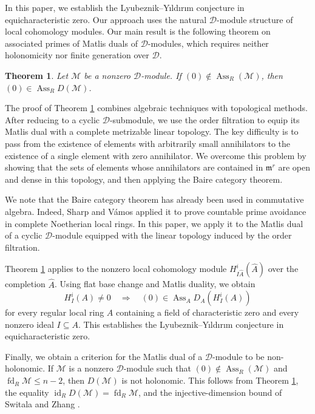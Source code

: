 \documentclass[11pt]{amsart}
\newtheorem{theorem}{Theorem}[section]
\theoremstyle{definition}
\newcommand{\m}{\mathfrak m}
\newcommand{\D}{\mathcal D}
\newcommand{\M}{\mathcal M}
\DeclareMathOperator{\Ass}{Ass}
\begin{document}
In this paper, we establish the Lyubeznik--Y{\i}ld{\i}r{\i}m conjecture in equicharacteristic zero. Our approach uses the natural $\D$-module structure of local cohomology modules. Our main result is the following theorem on associated primes of Matlis duals of $\D$-modules, which requires neither holonomicity nor finite generation over $\D$.
\begin{theorem}\label{t1}
Let $\M$ be a nonzero $\D$-module. If $(0)\notin\Ass _R(\M)$, then $(0)\in\Ass _R D(\M)$. 
\end{theorem}
The proof of Theorem \ref{t1} combines algebraic techniques with topological methods. After reducing to a cyclic $\D$-submodule, we use the order filtration to equip its Matlis dual with a complete metrizable linear topology. The key difficulty is to pass from the existence of elements with arbitrarily small annihilators to the existence of a single element with zero annihilator.  We overcome this problem by showing that the sets of elements whose annihilators are contained in $\m^r$ are open and dense in this topology, and then applying the Baire category theorem.

We note that the Baire category theorem has already been used in commutative algebra. Indeed, Sharp and V\'amos \cite{SV} applied it to prove countable prime avoidance in complete Noetherian local rings. In this paper, we apply it to the Matlis dual of a cyclic $\D$-module equipped with the linear topology induced by the order filtration.

Theorem \ref{t1} applies to the nonzero local cohomology module $H_{I\widehat A}^i(\widehat A)$ over the completion $\widehat A$. Using flat base change and Matlis duality, we obtain
\[
H_I^i(A)\neq 0
\quad\Longrightarrow\quad
(0)\in\Ass_A D_A(H_I^i(A))
\]
for every regular local ring $A$ containing a field of characteristic zero and every nonzero ideal $I\subseteq A$. This establishes the Lyubeznik--Y{\i}ld{\i}r{\i}m conjecture in equicharacteristic zero.

Finally, we obtain a criterion for the Matlis dual of a $\D$-module to be non-holonomic. If $\M$ is a nonzero $\D$-module such that $(0)\notin\Ass _R(\M)$ and $\operatorname{fd}_R \M\leq n-2$, then $D(\M)$ is not holonomic. This follows from Theorem \ref{t1}, the equality $\operatorname{id}_R D(\M)=\operatorname{fd}_R \M$, and the injective-dimension bound of Switala and Zhang \cite[Theorem 6.2]{SZ}.
\end{document}
